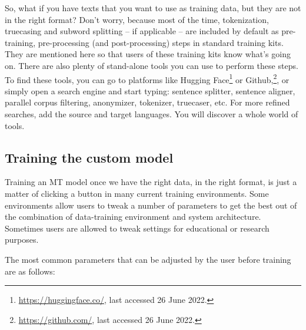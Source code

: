 \documentclass[output=paper]{langscibook}
\begin{document}
So, what if you have texts that you want to use as training data, but they are not in the right format? Don’t worry, because most of the time, tokenization, truecasing and subword splitting -- if applicable -- are included by default as pre-training, pre-processing (and post-processing) steps in standard training kits. They are mentioned here so that users of these training kits know what's going on. There are also plenty of stand-alone tools you can use to perform these steps. To find these tools, you can go to platforms like Hugging Face\footnote{\url{https://huggingface.co/}, last accessed 26 June 2022.} or Github,\footnote{\url{https://github.com/}, last accessed 26 June 2022.}, or simply open a search engine and start typing: sentence splitter, sentence aligner, parallel corpus filtering, anonymizer, tokenizer, truecaser, etc. For more refined searches, add the source and target languages. You will discover a whole world of tools.

\subsection{Training the custom model}\largerpage

Training an MT model once we have the right data, in the right format, is just a matter of clicking a button in many current training environments. Some environments allow users to tweak a number of parameters to get the best out of the combination of data-training environment and system architecture. Sometimes users are allowed to tweak settings for educational or research purposes. 

The most common parameters that can be adjusted by the user before training are as follows: 
\end{document}
